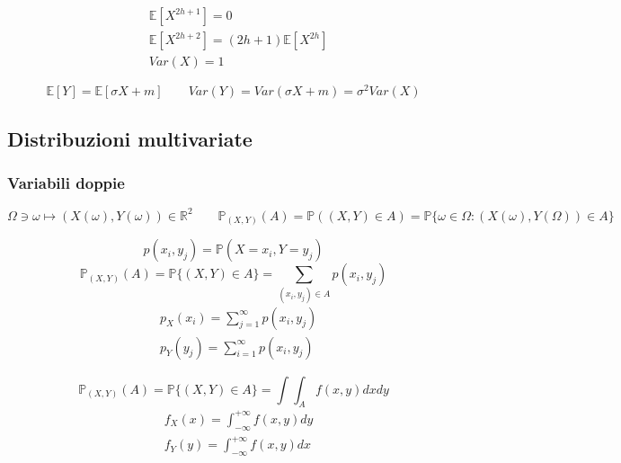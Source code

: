 \begin{proposition}
	\begin{align}
		& \mathbb{E}[X^{2h+1}] = 0 \\
		& \mathbb{E}[X^{2h+2}] = (2h+1)\mathbb{E}[X^{2h}] \\
		& Var(X) = 1
	\end{align}
\end{proposition}
\begin{proposition}
	\begin{equation}
		\mathbb{E}[Y] = \mathbb{E}[\sigma X + m]\quad\quad Var(Y) = Var(\sigma X + m) = \sigma^2 Var(X)
	\end{equation}
\end{proposition}

\subsection{Distribuzioni multivariate}
\subsubsection{Variabili doppie}
\begin{equation}
	\Omega \ni \omega \mapsto (X(\omega), Y(\omega)) \in \mathbb{R}^2 \quad\quad \mathbb{P}_{(X,Y)}(A) = \mathbb{P}((X,Y) \in A) = \mathbb{P}\{\omega \in \Omega : (X(\omega), Y(\Omega)) \in A\}
\end{equation}

\begin{proposition}
	\begin{equation}
		p(x_i,y_j) = \mathbb{P}(X=x_i, Y=y_j)
	\end{equation}
	\begin{equation}
		\mathbb{P}_{(X,Y)}(A) = \mathbb{P}\{(X,Y) \in A\} = \sum_{(x_i, y_j) \in A} p(x_i, y_j)
	\end{equation}
	\begin{align}
		& p_X(x_i) = \sum_{j=1}^{\infty}p(x_i, y_j) \\
		& p_Y(y_j) = \sum_{i=1}^{\infty}p(x_i, y_j)
	\end{align}
\end{proposition}

\begin{proposition}
	\begin{equation}
		\mathbb{P}_{(X,Y)}(A) = \mathbb{P}\{(X,Y) \in A\} = \int\int_A f(x,y)dxdy
	\end{equation}
	\begin{align}
		& f_X(x) = \int_{-\infty}^{+\infty} f(x,y) dy \\
		& f_Y(y) = \int_{-\infty}^{+\infty} f(x,y) dx 
	\end{align}
\end{proposition}

